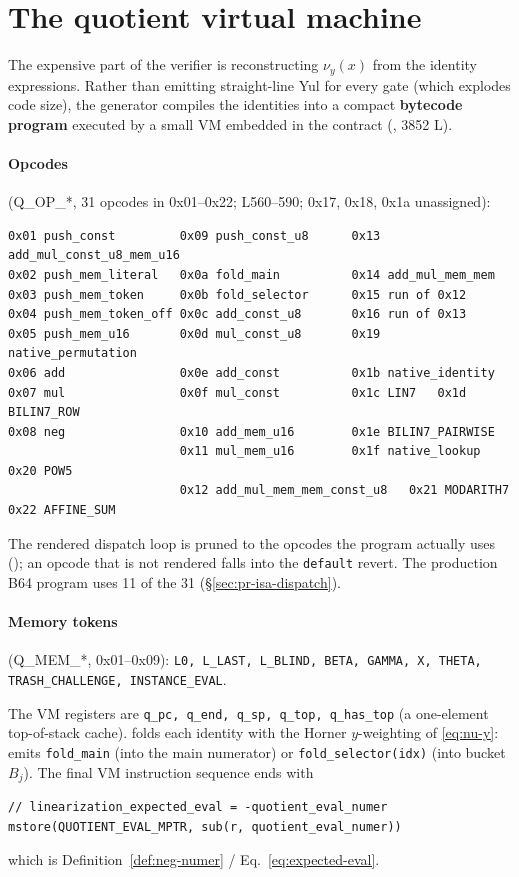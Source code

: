 \section{The quotient virtual machine}
\label{sec:quotient-vm}

The expensive part of the verifier is reconstructing $\nu_y(x)$ from the
identity expressions. Rather than emitting straight-line Yul for every
gate (which explodes code size), the generator compiles the identities
into a compact \textbf{bytecode program} executed by a small VM embedded
in the contract (, 3852 L).

\paragraph{Opcodes} (Q\_OP\_*, 31 opcodes in 0x01--0x22;
 L560--590; 0x17, 0x18, 0x1a unassigned):
\begin{lstlisting}[style=plain]
0x01 push_const         0x09 push_const_u8      0x13 add_mul_const_u8_mem_u16
0x02 push_mem_literal   0x0a fold_main          0x14 add_mul_mem_mem
0x03 push_mem_token     0x0b fold_selector      0x15 run of 0x12
0x04 push_mem_token_off 0x0c add_const_u8       0x16 run of 0x13
0x05 push_mem_u16       0x0d mul_const_u8       0x19 native_permutation
0x06 add                0x0e add_const          0x1b native_identity
0x07 mul                0x0f mul_const          0x1c LIN7   0x1d BILIN7_ROW
0x08 neg                0x10 add_mem_u16        0x1e BILIN7_PAIRWISE
                        0x11 mul_mem_u16        0x1f native_lookup  0x20 POW5
                        0x12 add_mul_mem_mem_const_u8   0x21 MODARITH7  0x22 AFFINE_SUM
\end{lstlisting}
The rendered dispatch loop is pruned to the opcodes the program actually
uses (); an opcode that is not rendered falls
into the \texttt{default} revert. The production B64 program uses 11 of
the 31 (\S\ref{sec:pr-isa-dispatch}).
\paragraph{Memory tokens} (Q\_MEM\_*, 0x01--0x09):
\texttt{L0, L\_\allowbreak{}LAST, L\_\allowbreak{}BLIND, BETA, GAMMA, X, THETA, TRASH\_\allowbreak{}CHALLENGE,
INSTANCE\_\allowbreak{}EVAL}.

The VM registers are \texttt{q\_\allowbreak{}pc, q\_\allowbreak{}end, q\_\allowbreak{}sp, q\_\allowbreak{}top, q\_\allowbreak{}has\_\allowbreak{}top}
(a one-element top-of-stack cache).  folds
each identity with the Horner $y$-weighting of \eqref{eq:nu-y}:
 emits \texttt{fold\_main} (into the main numerator)
or \texttt{fold\_\allowbreak{}selector(idx)} (into bucket $B_j$). The final VM
instruction sequence ends with
\begin{lstlisting}[style=yul]
// linearization_expected_eval = -quotient_eval_numer
mstore(QUOTIENT_EVAL_MPTR, sub(r, quotient_eval_numer))
\end{lstlisting}
which is Definition~\ref{def:neg-numer} / Eq.~\eqref{eq:expected-eval}.

